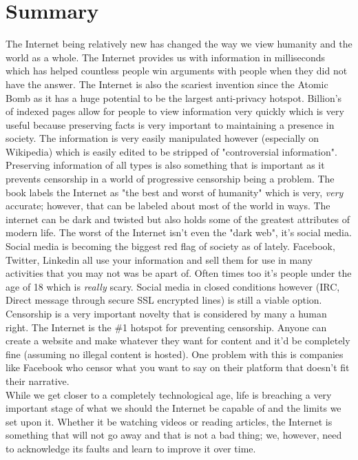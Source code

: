 \documentclass[12pt]{article}
\begin{document}
\section{Summary}
\indent The Internet being relatively new has changed the way we view humanity and the world as a whole. The Internet provides us with information in milliseconds which has helped countless people win arguments with people when they did not have the answer. The Internet is also the scariest invention since the Atomic Bomb as it has a huge potential to be the largest anti-privacy hotspot. Billion's of indexed pages allow for people to view information very quickly which is very useful because preserving facts is very important to maintaining a presence in society. The information is very easily manipulated however (especially on Wikipedia) which is easily edited to be stripped of "controversial information". Preserving information of all types is also something that is important as it prevents censorship in a world of progressive censorship being a problem. The book labels the Internet as "the best and worst of humanity" which is very, \emph{very} accurate; however, that can be labeled about most of the world in ways. The internet can be dark and twisted but also holds some of the greatest attributes of modern life. The worst of the Internet isn't even the "dark web", it's social media.\\
\indent Social media is becoming the biggest red flag of society as of lately. Facebook, Twitter, Linkedin all use your information and sell them for use in many activities that you may not was be apart of. Often times too it's people under the age of 18 which is \emph{really} scary. Social media in closed conditions however (IRC, Direct message through secure SSL encrypted lines) is still a viable option.\\
\indent Censorship is a very important novelty that is considered by many a human right. The Internet is the \#1 hotspot for preventing censorship. Anyone can create a website and make whatever they want for content and it'd be completely fine (assuming no illegal content is hosted). One problem with this is companies like Facebook who censor what you want to say on their platform that doesn't fit their narrative.\\
\indent While we get closer to a completely technological age, life is breaching a very important stage of what we should the Internet be capable of and the limits we set upon it. Whether it be watching videos or reading articles, the Internet is something that will not go away and that is not a bad thing; we, however, need to acknowledge its faults and learn to improve it over time.
\end{document}
